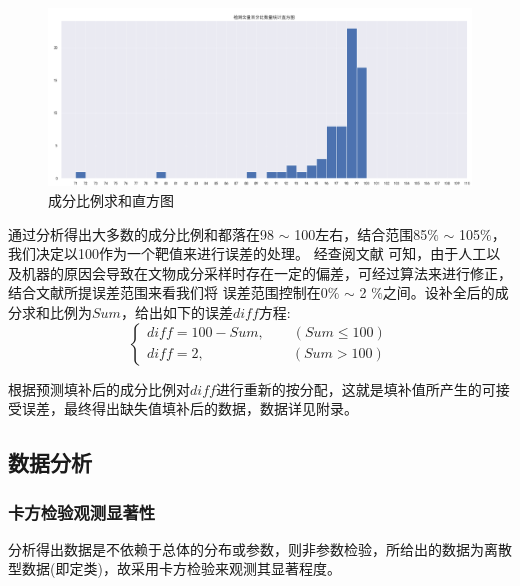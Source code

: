 \documentclass[UTF8]{ctexart}
\begin{document}
\begin{figure}[H]\centering
	\includegraphics[width=1\textwidth,height=0.48\textwidth]{img/成分比例求和直方图.png} %
	\caption{成分比例求和直方图} %
	\label{fig:figure 2} %
\end{figure}

通过分析得出大多数的成分比例和都落在98 $\sim$ 100左右，结合范围85$\%$ $\sim $ 105$\%$，我们决定以100作为一个靶值来进行误差的处理。
经查阅文献\cite{ref1} 可知，由于人工以及机器的原因会导致在文物成分采样时存在一定的偏差，可经过算法来进行修正，结合文献所提误差范围来看我们将
误差范围控制在0$\%$ $\sim$ 2 $\%$之间。设补全后的成分求和比例为$Sum$，给出如下的误差$diff$方程:
	\[\left\{\begin{array}{llcl}
		diff = 100-Sum,  \qquad (Sum \le 100) \\
		diff = 2, \qquad \qquad \qquad  \  (Sum>100)
		\end{array} \right.\]

根据预测填补后的成分比例对$diff$进行重新的按分配，这就是填补值所产生的可接受误差，最终得出缺失值填补后的数据，数据详见附录。


\subsection{数据分析}
\subsubsection{卡方检验观测显著性}
分析得出数据是不依赖于总体的分布或参数，则非参数检验，所给出的数据为离散型数据(即定类)，故采用卡方检验来观测其显著程度。
\end{document}
